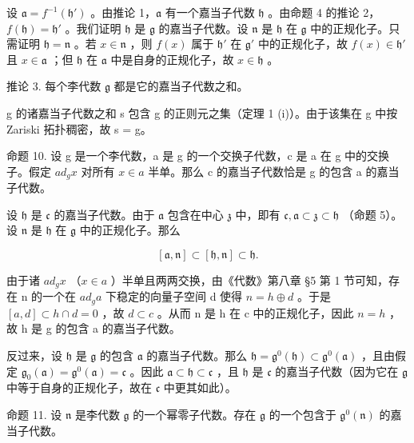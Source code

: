 设 \(\mathfrak{a} = f^{-1}(\mathfrak{h}')\) 。由推论 1，\(\mathfrak{a}\) 有一个嘉当子代数 \(\mathfrak{h}\) 。由命题 4 的推论 2，\(f(\mathfrak{h}) = \mathfrak{h}'\) 。我们证明 \(\mathfrak{h}\) 是 \(\mathfrak{g}\) 的嘉当子代数。设 \(\mathfrak{n}\) 是 \(\mathfrak{h}\) 在 \(\mathfrak{g}\) 中的正规化子。只需证明 \(\mathfrak{h} = \mathfrak{n}\) 。若 \(x \in \mathfrak{n}\) ，则 \(f(x)\) 属于 \(\mathfrak{h}'\) 在 \(\mathfrak{g}'\) 中的正规化子，故 \(f(x) \in \mathfrak{h}'\) 且 \(x \in \mathfrak{a}\) ；但 \(\mathfrak{h}\) 在 \(\mathfrak{a}\) 中是自身的正规化子，故 \(x \in \mathfrak{h}\) 。

推论 3. 每个李代数 \(\mathfrak{g}\) 都是它的嘉当子代数之和。

g 的诸嘉当子代数之和 s 包含 g 的正则元之集（定理 1 (i)）。由于该集在 g 中按 Zariski 拓扑稠密，故 s = g。

命题 10. 设 g 是一个李代数，a 是 g 的一个交换子代数，c 是 a 在 g 中的交换子。假定 \(ad_{g}x\) 对所有 \(x \in a\) 半单。那么 c 的嘉当子代数恰是 g 的包含 a 的嘉当子代数。

设 \(\mathfrak{h}\) 是 \(\mathfrak{c}\) 的嘉当子代数。由于 \(\mathfrak{a}\) 包含在中心 \(\mathfrak{z}\) 中，即有 \(\mathfrak{c}, \mathfrak{a} \subset \mathfrak{z} \subset \mathfrak{h}\) （命题 5）。设 \(\mathfrak{n}\) 是 \(\mathfrak{h}\) 在 \(\mathfrak{g}\) 中的正规化子。那么

\[
[ \mathfrak {a}, \mathfrak {n} ] \subset [ \mathfrak {h}, \mathfrak {n} ] \subset \mathfrak {h}.
\]

由于诸 \(ad_{g}x\) （\(x \in a\) ）半单且两两交换，由《代数》第八章 §5 第 1 节可知，存在 n 的一个在 \(ad_{g}a\) 下稳定的向量子空间 d 使得 \(n = h \oplus d\) 。于是 \([a, d] \subset h \cap d = 0\) ，故 \(d \subset c\) 。从而 n 是 h 在 c 中的正规化子，因此 \(n = h\) ，故 h 是 g 的包含 a 的嘉当子代数。

反过来，设 \(\mathfrak{h}\) 是 \(\mathfrak{g}\) 的包含 \(\mathfrak{a}\) 的嘉当子代数。那么 \(\mathfrak{h} = \mathfrak{g}^0 (\mathfrak{h})\subset \mathfrak{g}^0 (\mathfrak{a})\) ，且由假定 \(\mathfrak{g}_0(\mathfrak{a}) = \mathfrak{g}^0 (\mathfrak{a}) = \mathfrak{c}\) 。因此 \(\mathfrak{a}\subset \mathfrak{h}\subset \mathfrak{c}\) ，且 \(\mathfrak{h}\) 是 \(\mathfrak{c}\) 的嘉当子代数（因为它在 \(\mathfrak{g}\) 中等于自身的正规化子，故在 \(\mathfrak{c}\) 中更其如此）。

命题 11. 设 \(\mathfrak{n}\) 是李代数 \(\mathfrak{g}\) 的一个幂零子代数。存在 \(\mathfrak{g}\) 的一个包含于 \(\mathfrak{g}^0 (\mathfrak{n})\) 的嘉当子代数。

